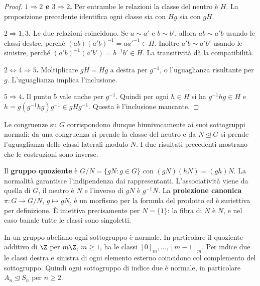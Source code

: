 \begin{proof}
\textbf{$1\Rightarrow2$ e $3\Rightarrow2$.} Per entrambe le relazioni la classe del neutro è $H$. La proposizione precedente identifica ogni classe sia con $Hg$ sia con $gH$.

\textbf{$2\Rightarrow1,3$.} Le due relazioni coincidono. Se $a\sim a'$ e $b\sim b'$, allora $ab\sim a'b$ usando le classi destre, perché $(ab)(a'b)^{-1}=aa'^{-1}\in H$. Inoltre $a'b\sim a'b'$ usando le sinistre, perché $(a'b)^{-1}(a'b')=b^{-1}b'\in H$. La transitività dà la compatibilità.

\textbf{$2\Leftrightarrow4\Rightarrow5$.} Moltiplicare $gH=Hg$ a destra per $g^{-1}$, o l'uguaglianza risultante per $g$. L'uguaglianza implica l'inclusione.

\textbf{$5\Rightarrow4$.} Il punto 5 vale anche per $g^{-1}$. Quindi per ogni $h\in H$ si ha $g^{-1}hg\in H$ e $h=g(g^{-1}hg)g^{-1}\in gHg^{-1}$. Questa è l'inclusione mancante.
\end{proof}
Le congruenze su $G$ corrispondono dunque biunivocamente ai suoi sottogruppi normali: da una congruenza si prende la classe del neutro e da $N\trianglelefteq G$ si prende l'uguaglianza delle classi laterali modulo $N$. I due risultati precedenti mostrano che le costruzioni sono inverse.

\begin{definizione}
Il \textbf{gruppo quoziente} è $G/N=\{gN:g\in G\}$ con $(gN)(hN)=(gh)N$. La normalità garantisce l'indipendenza dai rappresentanti. L'associatività viene da quella di $G$, il neutro è $N$ e l'inverso di $gN$ è $g^{-1}N$. La \textbf{proiezione canonica} $\pi:G\to G/N$, $g\mapsto gN$, è un morfismo per la formula del prodotto ed è suriettiva per definizione. È iniettiva precisamente per $N=\{1\}$: la fibra di $N$ è $N$, e nel caso banale tutte le classi sono singoletti.
\end{definizione}
In un gruppo abeliano ogni sottogruppo è normale. In particolare il quoziente additivo di $\Z$ per $m\Z$, $m\ge1$, ha le classi $[0]_m,\ldots,[m-1]_m$. Per indice due le classi destra e sinistra di ogni elemento esterno coincidono col complemento del sottogruppo. Quindi ogni sottogruppo di indice due è normale, in particolare $A_n\trianglelefteq S_n$ per $n\ge2$.

